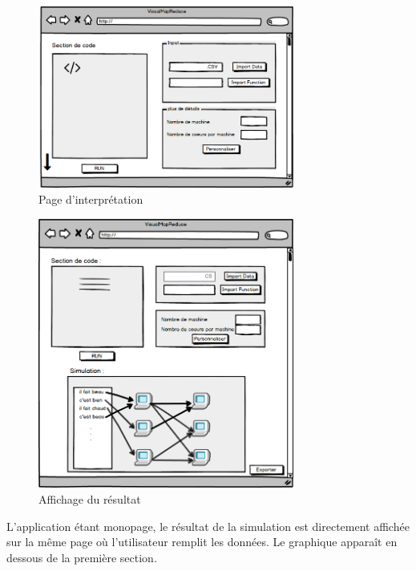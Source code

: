 \begin{figure}[H]
  \centering
    \includegraphics[width=0.75\textwidth]{images/interface/page_interpret1.png}
    \caption{Page d'interprétation}
\end{figure}

\begin{figure}[H]
  \centering
    \includegraphics[width=0.75\textwidth]{images/interface/page_interpret2.png}
    \caption{Affichage du résultat}
\end{figure}

L'application étant monopage, le résultat de la simulation est directement affichée sur la même page où l'utilisateur remplit les données. Le graphique apparaît en dessous de la première section.


